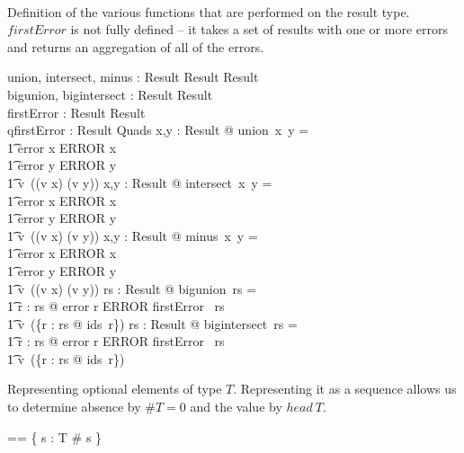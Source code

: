 \documentclass{article}
\begin{document}
\paragraph{}
Definition of the various functions that are performed on the result type. \\
$firstError$ is not fully defined -- it takes a set of results with one or more errors
and returns an aggregation of all of the errors.
\begin{gendef}
   union, intersect, minus : Result \fun Result \fun Result \\
   bigunion, bigintersect : \power Result \fun Result \\
   firstError : \power Result \pfun Result \\
   qfirstError : \power Result \pfun Quads 
\where
   \forall x,y : Result @ union~x~y = \\
\t1 \IF error \inv x \in ERROR \THEN x \\
\t1 \ELSE \IF error \inv y \in ERROR \THEN y \\
\t1 \ELSE v~((v \inv x) \cup (v \inv y))
\also
   \forall x,y : Result @ intersect~x~y = \\
\t1 \IF error \inv x \in ERROR \THEN x \\
\t1 \ELSE \IF error \inv y \in ERROR \THEN y \\
\t1 \ELSE v~((v \inv x) \cap (v \inv y))
\also
   \forall x,y : Result @ minus~x~y = \\
\t1 \IF error \inv x \in ERROR \THEN x \\
\t1 \ELSE \IF error \inv y \in ERROR \THEN y \\
\t1 \ELSE v~((v \inv x) \setminus (v \inv y))
\also
  \forall rs : \power Result @ bigunion~rs = \\
\t1 \IF \exists r : rs @ error \inv r \in ERROR \THEN firstError~ rs \\
\t1 \ELSE v~(\bigcup \{r : rs @ ids~r\})
\also
  \forall rs : \power Result @ bigintersect~rs = \\
\t1 \IF \exists r : rs @ error \inv r \in ERROR \THEN firstError~ rs \\
\t1 \ELSE v~(\bigcap \{r : rs @ ids~r\})
\end{gendef}

   




\appendix
Representing optional elements of type $T$.  Representing it as a sequence allows us to
determine absence by $\#T = 0$ and the value by $head~T$. 

\begin{zed} 
  \optional[T] == \{ s : \seq T \mid \# s  \} \\
\end{zed}
\end{document}

